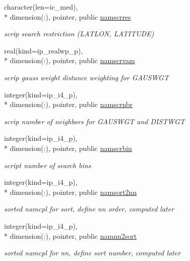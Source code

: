 \begin{DoxyCompactItemize}
character(len=ic\+\_\+med), \\*
dimension(\+:), pointer, public \hyperlink{classmod__oasis__namcouple_a6a95ddbbbc615e0257d93d05e4546239}{namscrres}
\begin{DoxyCompactList}\small\item\em scrip search restriction (L\+A\+T\+L\+O\+N, L\+A\+T\+I\+T\+U\+D\+E) \end{DoxyCompactList}\item 
real(kind=ip\+\_\+realwp\+\_\+p), \\*
dimension(\+:), pointer, public \hyperlink{classmod__oasis__namcouple_a45b410743ce74a9824d44b329ba323ba}{namscrvam}
\begin{DoxyCompactList}\small\item\em scrip gauss weight distance weighting for G\+A\+U\+S\+W\+G\+T \end{DoxyCompactList}\item 
integer(kind=ip\+\_\+i4\+\_\+p), \\*
dimension(\+:), pointer, public \hyperlink{classmod__oasis__namcouple_a20d614468823744b82118ee8cf2df852}{namscrnbr}
\begin{DoxyCompactList}\small\item\em scrip number of neighbors for G\+A\+U\+S\+W\+G\+T and D\+I\+S\+T\+W\+G\+T \end{DoxyCompactList}\item 
integer(kind=ip\+\_\+i4\+\_\+p), \\*
dimension(\+:), pointer, public \hyperlink{classmod__oasis__namcouple_a728405e8f669b58d00c189abf8b62437}{namscrbin}
\begin{DoxyCompactList}\small\item\em script number of search bins \end{DoxyCompactList}\item 
integer(kind=ip\+\_\+i4\+\_\+p), \\*
dimension(\+:), pointer, public \hyperlink{classmod__oasis__namcouple_a4555b14f38928b7f0fb7f77b9c42d0a0}{namsort2nn}
\begin{DoxyCompactList}\small\item\em sorted namcpl for sort, define nn order, computed later \end{DoxyCompactList}\item 
integer(kind=ip\+\_\+i4\+\_\+p), \\*
dimension(\+:), pointer, public \hyperlink{classmod__oasis__namcouple_a0ace7c451d8658759b9c8d871926a76e}{namnn2sort}
\begin{DoxyCompactList}\small\item\em sorted namcpl for nn, define sort number, computed later \end{DoxyCompactList}\end{DoxyCompactItemize}
